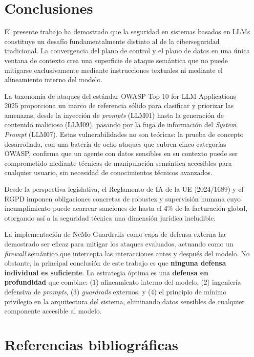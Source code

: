 \documentclass[12pt]{article}
\begin{document}
\section{Conclusiones}
El presente trabajo ha demostrado que la seguridad en sistemas basados en LLMs constituye un desafío fundamentalmente distinto al de la ciberseguridad tradicional. La convergencia del plano de control y el plano de datos en una única ventana de contexto crea una superficie de ataque semántica que no puede mitigarse exclusivamente mediante instrucciones textuales ni mediante el alineamiento interno del modelo.

La taxonomía de ataques del estándar OWASP Top 10 for LLM Applications 2025 proporciona un marco de referencia sólido para clasificar y priorizar las amenazas, desde la inyección de \textit{prompts} (LLM01) hasta la generación de contenido malicioso (LLM09), pasando por la fuga de información del \textit{System Prompt} (LLM07). Estas vulnerabilidades no son teóricas: la prueba de concepto desarrollada, con una batería de ocho ataques que cubren cinco categorías OWASP, confirma que un agente con datos sensibles en su contexto puede ser comprometido mediante técnicas de manipulación semántica accesibles para cualquier usuario, sin necesidad de conocimientos técnicos avanzados.

Desde la perspectiva legislativa, el Reglamento de IA de la UE (2024/1689) y el RGPD imponen obligaciones concretas de robustez y supervisión humana cuyo incumplimiento puede acarrear sanciones de hasta el 4\% de la facturación global, otorgando así a la seguridad técnica una dimensión jurídica ineludible.

La implementación de NeMo Guardrails como capa de defensa externa ha demostrado ser eficaz para mitigar los ataques evaluados, actuando como un \textit{firewall} semántico que intercepta las interacciones antes y después del modelo. No obstante, la principal conclusión de este trabajo es que \textbf{ninguna defensa individual es suficiente}. La estrategia óptima es una \textbf{defensa en profundidad} que combine: (1) alineamiento interno del modelo, (2) ingeniería defensiva de \textit{prompts}, (3) \textit{guardrails} externos, y (4) el principio de mínimo privilegio en la arquitectura del sistema, eliminando datos sensibles de cualquier componente accesible al modelo.


\section{Referencias bibliográficas}
\printbibliography[heading=none]
\end{document}
